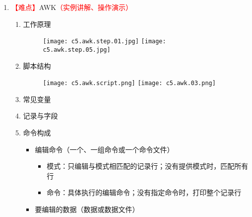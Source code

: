 \documentclass{TIJMUjiaoanLL}
\begin{document}
\begin{enumerate}
\begin{enumerate}
      \item \textcolor{red}{【难点】}AWK\textcolor{red}{（实例讲解、操作演示）}
	\begin{enumerate}
	  \item 工作原理
	  \vspace*{-10pt}
	    \begin{figure}[h]
	      \centering
	      \texttt{[image: c5.awk.step.01.jpg]}
	      \quad
	      \texttt{[image: c5.awk.step.05.jpg]}
	  \end{figure}
	  \vspace*{-10pt}
	  \item 脚本结构
	  \vspace*{-10pt}
	    \begin{figure}[h]
	      \centering
	      \texttt{[image: c5.awk.script.png]}
	      \quad
	      \texttt{[image: c5.awk.03.png]}
	  \end{figure}
	  \vspace*{-10pt}
	  \item 常见变量
	  \item 记录与字段
	  \item 命令构成
	    \begin{itemize}
	      \item 编辑命令（一个、一组命令或一个命令文件）
	        \begin{itemize}
	          \item 模式：只编辑与模式相匹配的记录行；没有提供模式时，匹配所有行
	          \item 命令：具体执行的编辑命令；没有指定命令时，打印整个记录行
                \end{itemize}
              \item 要编辑的数据（数据或数据文件）
	    \end{itemize}

\otherTail
\newpage
\otherHeader


\end{enumerate}
\end{enumerate}
\end{enumerate}
\end{document}
